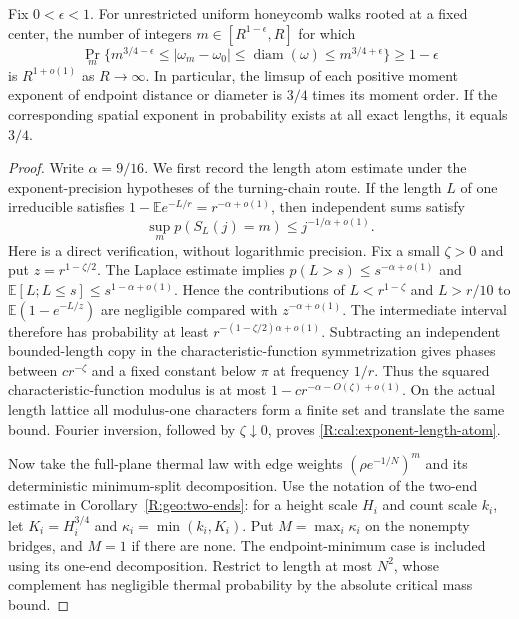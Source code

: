 \begin{proposition}
\label{R:cal:good-cardinality}
Fix $0<\epsilon<1$. For unrestricted uniform honeycomb walks rooted at a
fixed center, the number of integers $m\in[R^{1-\epsilon},R]$ for which
\[
 \Pr_m\{m^{3/4-\epsilon}\le |\omega_m-\omega_0|
       \le\operatorname{diam}(\omega)\le m^{3/4+\epsilon}\}
       \ge1-\epsilon
\]
is $R^{1+o(1)}$ as $R\to\infty$. In particular, the limsup of each positive
moment exponent of endpoint distance or diameter is $3/4$ times its moment
order. If the corresponding spatial exponent in probability exists at all
exact lengths, it equals $3/4$.
\end{proposition}
\begin{proof}
Write $\alpha=9/16$. We first record the length atom estimate under the
exponent-precision hypotheses of the turning-chain route. If the length
$L$ of one irreducible satisfies
$1-\mathbb E e^{-L/r}=r^{-\alpha+o(1)}$, then independent sums satisfy
\begin{equation}
 \sup_m p(S_L(j)=m)\le j^{-1/\alpha+o(1)}.
 \label{R:cal:exponent-length-atom}
\end{equation}
Here is a direct verification, without logarithmic precision. Fix a small
$\zeta>0$ and put $z=r^{1-\zeta/2}$. The Laplace estimate implies
$p(L>s)\le s^{-\alpha+o(1)}$ and
$\mathbb E[L;L\le s]\le s^{1-\alpha+o(1)}$. Hence the contributions of
$L<r^{1-\zeta}$ and $L>r/10$ to
$\mathbb E(1-e^{-L/z})$ are negligible compared with $z^{-\alpha+o(1)}$.
The intermediate interval therefore has probability at least
$r^{-(1-\zeta/2)\alpha+o(1)}$. Subtracting an independent bounded-length
copy in the characteristic-function symmetrization gives phases between
$c r^{-\zeta}$ and a fixed constant below $\pi$ at frequency $1/r$.
Thus the squared characteristic-function modulus is at most
$1-c r^{-\alpha-O(\zeta)+o(1)}$. On the actual length lattice all
modulus-one characters form a finite set and translate the same bound.
Fourier inversion, followed by $\zeta\downarrow0$, proves
\eqref{R:cal:exponent-length-atom}.

Now take the full-plane thermal law with edge weights
$(\rho e^{-1/N})^m$ and its deterministic minimum-split decomposition.
Use the notation of the two-end estimate in
Corollary~\ref{R:geo:two-ends}: for a height scale $H_i$ and count scale
$k_i$, let $K_i=H_i^{3/4}$ and $\kappa_i=\min(k_i,K_i)$. Put
$M=\max_i\kappa_i$ on the nonempty bridges, and $M=1$ if there are none.
The endpoint-minimum case is included using its one-end decomposition.
Restrict to length at most $N^2$, whose complement has negligible thermal
probability by the absolute critical mass bound.


\end{proof}
